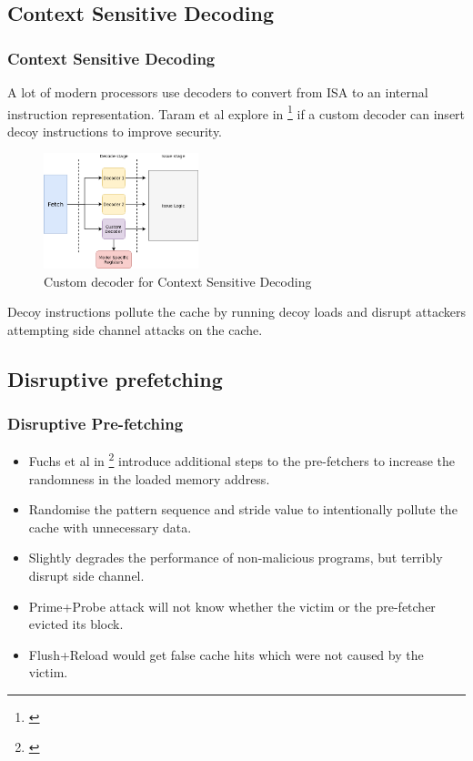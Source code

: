 \documentclass[10pt]{beamer}
\begin{document}
\subsection{Context Sensitive Decoding}
\begin{frame}
\frametitle{Context Sensitive Decoding}
A lot of modern processors use decoders to convert from ISA to an internal instruction
    representation. Taram et al explore in \footnote{\cite{csd}} if a custom decoder can insert decoy
instructions to improve security.
\begin{figure}
\centering
\includegraphics[width=0.4\textwidth]{csd}
\caption{Custom decoder for Context Sensitive Decoding}
\end{figure}
Decoy instructions pollute the cache by running decoy loads and
disrupt attackers attempting side channel attacks on the cache.
\end{frame}

\subsection{Disruptive prefetching}
\begin{frame}
\frametitle{Disruptive Pre-fetching}
\begin{itemize}
    \item Fuchs et al in \footnote{\cite{disruptive_prefetch}} introduce additional steps to the pre-fetchers to increase the randomness
in the loaded memory address.
\item Randomise the pattern sequence and stride value to intentionally pollute the cache with unnecessary data.
\item Slightly degrades the performance of non-malicious programs, but terribly disrupt side channel.
\item Prime+Probe attack will not know whether the victim or the pre-fetcher evicted its block.
\item Flush+Reload would get false cache hits which were not caused by the victim.
\end{itemize}
\end{frame}
\end{document}
